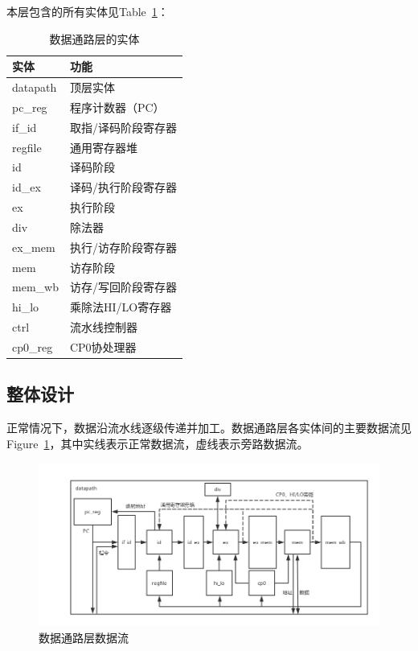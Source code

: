\documentclass{article}
\begin{document}
\begin{spacing}{1.4}
本层包含的所有实体见Table~\ref{tb:datapath-entities}：

\begin{table}[!htb]
\begin{center}
\begin{tabular}{p{7.5cm}|p{7.5cm}}  
\hline  
\textbf{实体}&\textbf{功能} \\
\hline datapath & 顶层实体 \\
\hline pc\_reg & 程序计数器（PC） \\
\hline if\_id & 取指/译码阶段寄存器 \\
\hline regfile & 通用寄存器堆 \\
\hline id & 译码阶段 \\
\hline id\_ex & 译码/执行阶段寄存器 \\
\hline ex & 执行阶段 \\
\hline div & 除法器 \\
\hline ex\_mem & 执行/访存阶段寄存器 \\
\hline mem & 访存阶段 \\
\hline mem\_wb & 访存/写回阶段寄存器 \\
\hline hi\_lo & 乘除法HI/LO寄存器 \\
\hline ctrl & 流水线控制器 \\
\hline cp0\_reg & CP0协处理器 \\
\hline 
\end{tabular}  
\caption{数据通路层的实体}
\label{tb:datapath-entities}
\end{center}
\end{table}

\subsection{整体设计}

正常情况下，数据沿流水线逐级传递并加工。数据通路层各实体间的主要数据流见Figure~\ref{fig:datapath-data-flow}，其中实线表示正常数据流，虚线表示旁路数据流。

\begin{figure}[!htb]
	\centering
	\includegraphics[width=\textwidth]{datapath-data-flow.png}
	\caption{数据通路层数据流}
    \label{fig:datapath-data-flow}
\end{figure}


\end{spacing}
\end{document}
